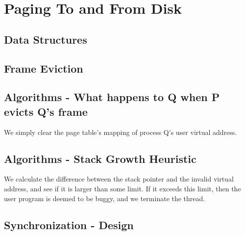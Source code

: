 
\section{Paging To and From Disk}

\subsection{Data Structures}


\subsection{Frame Eviction}


\subsection{Algorithms - What happens to Q when P evicts Q's frame}


We simply clear the page table's mapping of process Q's user virtual address.

\subsection{Algorithms - Stack Growth Heuristic}


We calculate the difference between the stack pointer and the invalid virtual
address, and see if it is larger than some limit. If it exceeds this limit, then
the user program is deemed to be buggy, and we terminate the thread.

\subsection{Synchronization - Design}

